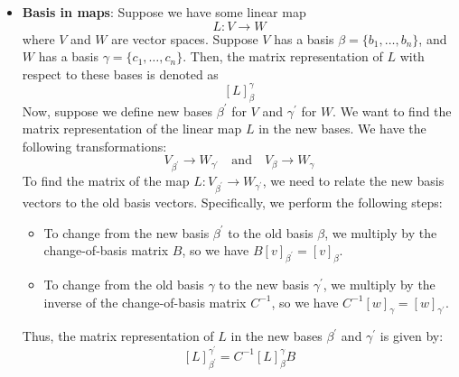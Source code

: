 \documentclass{report}
\begin{document}
\begin{itemize}
        \item \textbf{Basis in maps}: Suppose we have some linear map
            \[
                L: V \to W
            \]
            where \(V\) and \(W\) are vector spaces. Suppose \(V\) has a basis \(\beta = \{b_{1}, \dots, b_{n}\}\), and \(W\) has a basis \(\gamma = \{c_{1}, \dots, c_{n}\}\). Then, the matrix representation of \(L\) with respect to these bases is denoted as
            \[
                [L]_{\beta}^{\gamma}
            \]
            Now, suppose we define new bases \(\beta^{\prime}\) for \(V\) and \(\gamma^{\prime}\) for \(W\). We want to find the matrix representation of the linear map \(L\) in the new bases.
            \bigbreak \noindent 
            We have the following transformations:
            \[
                V_{\beta^{\prime}} \to W_{\gamma^{\prime}} \quad \text{and} \quad V_{\beta} \to W_{\gamma}
            \]
            To find the matrix of the map \(L: V_{\beta^{\prime}} \to W_{\gamma^{\prime}}\), we need to relate the new basis vectors to the old basis vectors. Specifically, we perform the following steps:
            \begin{itemize}
                \item To change from the new basis \(\beta^{\prime}\) to the old basis \(\beta\), we multiply by the change-of-basis matrix \(B\), so we have \(B[v]_{\beta^{\prime}} = [v]_{\beta}\).
                \item To change from the old basis \(\gamma\) to the new basis \(\gamma^{\prime}\), we multiply by the inverse of the change-of-basis matrix \(C^{-1}\), so we have \(C^{-1}[w]_{\gamma} = [w]_{\gamma^{\prime}}\).
            \end{itemize}
            \bigbreak \noindent 
            Thus, the matrix representation of \(L\) in the new bases \(\beta^{\prime}\) and \(\gamma^{\prime}\) is given by:
            \[
                [L]_{\beta^{\prime}}^{\gamma^{\prime}} = C^{-1}[L]_{\beta}^{\gamma}B
            \]

\end{itemize}
\end{document}
